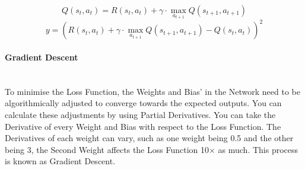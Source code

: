 \begin{flushleft}
                    \[Q(s_t, a_t) = R(s_t, a_t) + \gamma \cdot \max_{a_{t+1}} Q(s_{t+1}, a_{t+1})\]
                    \[y = \left( R(s_t, a_t) + \gamma \cdot \max_{a_{t+1}} Q(s_{t+1}, a_{t+1}) - Q(s_t, a_t) \right)^2\]

                \paragraph{Gradient Descent} \mbox{} \\ 
                    To minimise the Loss Function, the Weights and Bias' in the Network need to be algorithmically adjusted to converge towards the expected outputs. You can
                    calculate these adjustments by using Partial Derivatives. You can take the Derivative of every Weight and Bias with respect to the Loss Function. The Derivatives
                    of each weight can vary, such as one weight being 0.5 and the other being 3, the Second Weight affects the Loss Function 10$\times$ as much. This process is
                    known as Gradient Descent. \\


\end{flushleft}
